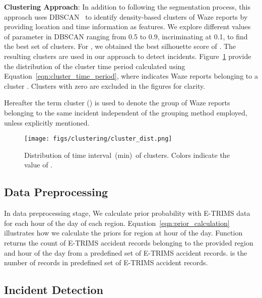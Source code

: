 \documentclass[conference]{IEEEtran}
\begin{document}
\textbf{Clustering Approach}: In addition to following the segmentation process, this approach uses DBSCAN~\cite{ester1996density} to identify density-based clusters of Waze reports by providing location and time information as features. We explore different values of  parameter in DBSCAN ranging from 0.5 to 0.9, incriminating at 0.1, to find the best set of clusters. For , we obtained the best silhouette score of . The resulting clusters are used in our approach to detect incidents.  Figure~\ref{fig:cluster_dist} provide the distribution of the cluster time period calculated using Equation~\ref{eqn:cluster_time_period}, where  indicates Waze reports belonging to a cluster . Clusters with zero  are excluded in the figures for clarity.

Hereafter the term cluster () is used to denote the group of Waze reports belonging to the same incident independent of the grouping method employed, unless explicitly mentioned.


\vspace{-0.1in}


\begin{figure}[ht!]
    \centering
      \texttt{[image: figs/clustering/cluster\_dist.png]}
      \caption{Distribution of time interval (min) of clusters. Colors indicate the value of .} 
      \label{fig:cluster_dist}
      \vspace{-0.1in}
\end{figure}



\subsection{Data Preprocessing}
\label{sec:preprocessing}

In data preprocessing stage, We calculate prior probability with E-TRIMS data for each hour of the day of each region. Equation~\ref{eqn:prior_calculation} illustrates how we calculate the priors for region  at hour  of the day. Function  returns the count of E-TRIMS accident records belonging to the provided region and hour of the day from a predefined set of E-TRIMS accident records.  is the number of records in predefined set of E-TRIMS accident records.



\subsection{Incident Detection}
\label{subsec:pred}
\end{document}

